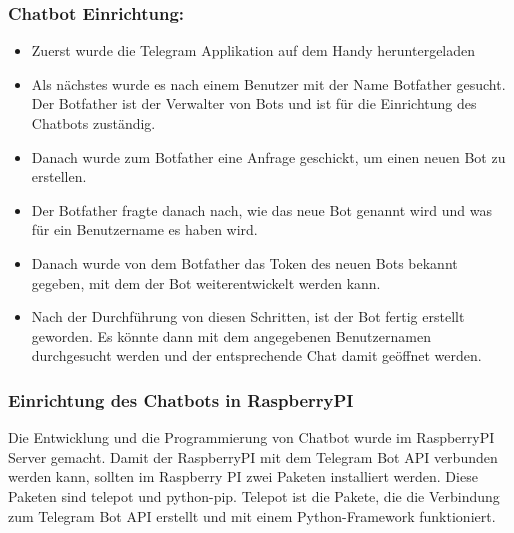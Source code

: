 \subsubsection{Chatbot Einrichtung:}
\begin{itemize}
	\item Zuerst wurde die Telegram Applikation auf dem Handy heruntergeladen
\end{itemize}
\begin{itemize}
	\item Als nächstes wurde es nach einem Benutzer mit der Name Botfather gesucht. Der Botfather ist der Verwalter von Bots und ist für die Einrichtung des Chatbots zuständig.
\end{itemize}
\begin{itemize}
	\item Danach wurde zum Botfather eine Anfrage geschickt, um einen neuen Bot zu erstellen. 
\end{itemize}
\begin{itemize}
	\item Der Botfather fragte danach nach, wie das neue Bot genannt wird und was für ein Benutzername es haben wird.  
\end{itemize}
\begin{itemize}
	\item Danach wurde von dem Botfather das Token des neuen Bots bekannt gegeben, mit dem der Bot weiterentwickelt werden kann. 
\end{itemize}
\begin{itemize}
	\item Nach der Durchführung von diesen Schritten, ist der Bot fertig erstellt geworden. Es könnte dann mit dem angegebenen Benutzernamen durchgesucht werden und der entsprechende Chat damit geöffnet werden. 
\end{itemize}
\subsubsection{Einrichtung des Chatbots in RaspberryPI}
Die Entwicklung und die Programmierung von Chatbot wurde im RaspberryPI Server gemacht. Damit der RaspberryPI mit dem Telegram Bot API verbunden werden kann, sollten im Raspberry PI zwei Paketen installiert werden. Diese Paketen sind telepot und python-pip. Telepot ist die Pakete, die die Verbindung zum Telegram Bot API erstellt und mit einem Python-Framework funktioniert.\cite{50_telegram}
